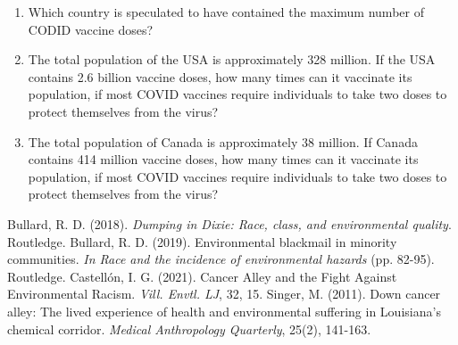 \documentclass[a4paper, 11pt]{article}
\begin{document}
\begin{enumerate}[font=\bfseries]
\begin{enumerate}[label=\alph*), itemsep=0.5ex]
					\item Which country is speculated to have contained the maximum number of CODID vaccine doses?
					\item The total population of the USA is approximately 328 million. If the USA contains 2.6 billion vaccine doses, how many times can it vaccinate its population, if most COVID vaccines require individuals to take two doses to protect themselves from the virus?
					\item The total population of Canada is approximately 38 million. If Canada contains 414 million vaccine doses, how many times can it vaccinate its population, if most COVID vaccines require individuals to take two doses to protect themselves from the virus?
				\end{enumerate}
	\end{enumerate}
%
%
%
%
%
%	
%
%
%
%
%
%
%
\begin{thebibliography}{}
	Bullard, R. D. (2018). \emph{Dumping in Dixie: Race, class, and environmental quality}. Routledge.
	Bullard, R. D. (2019). Environmental blackmail in minority communities. \emph{In Race and the incidence of environmental hazards} (pp. 82-95). Routledge.
	Castellón, I. G. (2021). Cancer Alley and the Fight Against Environmental Racism. \emph{Vill. Envtl. LJ}, 32, 15.
	Singer, M. (2011). Down cancer alley: The lived experience of health and environmental suffering in Louisiana's chemical corridor. \emph{Medical Anthropology Quarterly}, 25(2), 141-163.
\end{thebibliography}
%
%
%
%

%
%
\newpage
\end{document}

